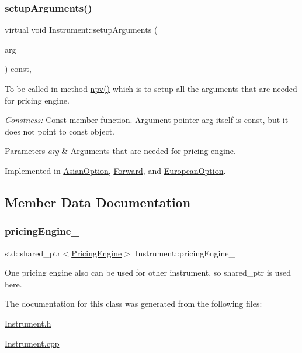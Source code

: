 \subsubsection{\texorpdfstring{setup\+Arguments()}{setupArguments()}}
{\footnotesize\ttfamily virtual void Instrument\+::setup\+Arguments (\begin{DoxyParamCaption}\item[{\hyperlink{class_pricing_engine_1_1_arguments}{Pricing\+Engine\+::\+Arguments} $\ast$const}]{arg }\end{DoxyParamCaption}) const\hspace{0.3cm}{\ttfamily [protected]}, {}}



To be called in method \hyperlink{class_instrument_aa750f2ae95a21d65a073da3171e8d084}{npv()} which is to setup all the arguments that are needed for pricing engine. 

{\itshape Constness\+:} Const member function. Argument pointer arg itself is const, but it does not point to const object. 
\begin{DoxyParams}{Parameters}
{\em arg} & Arguments that are needed for pricing engine. \\
\hline
\end{DoxyParams}


Implemented in \hyperlink{class_asian_option_a82c9b5fb3bea69f476a65e9675e1cc28}{Asian\+Option}, \hyperlink{class_forward_a909ab0cefa0ab42bdaf3bf6e84ac0096}{Forward}, and \hyperlink{class_european_option_a77e3bc17dbcf317561c4920f6bfa84de}{European\+Option}.



\subsection{Member Data Documentation}
\hypertarget{class_instrument_a6fdd5548ccc944536ff73913d98bf598}{}\label{class_instrument_a6fdd5548ccc944536ff73913d98bf598} 
\subsubsection{\texorpdfstring{pricing\+Engine\+\_\+}{pricingEngine\_}}
{\footnotesize\ttfamily std\+::shared\+\_\+ptr$<$\hyperlink{class_pricing_engine}{Pricing\+Engine}$>$ Instrument\+::pricing\+Engine\+\_\+\hspace{0.3cm}{\ttfamily [protected]}}



One pricing engine also can be used for other instrument, so shared\+\_\+ptr is used here. 



The documentation for this class was generated from the following files\+:\begin{DoxyCompactItemize}
\item 
\hyperlink{_instrument_8h}{Instrument.\+h}\item 
\hyperlink{_instrument_8cpp}{Instrument.\+cpp}\end{DoxyCompactItemize}
